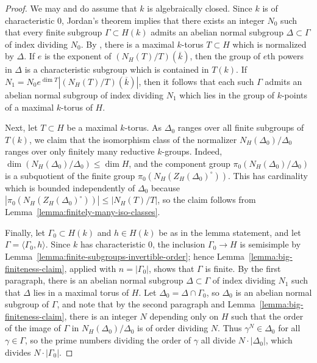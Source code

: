 \documentclass[reqno]{amsart}
\numberwithin{equation}{subsection}
\newcommand{\ol}[1]{\overline{#1}}
\theoremstyle{remark}
\numberwithin{equation}{subsection}
\numberwithin{figure}{subsection}
\begin{document}
\begin{proof}
We may and do assume that $k$ is algebraically closed. Since $k$ is of characteristic $0$, Jordan's theorem implies that there exists an integer $N_0$ such that every finite subgroup $\Gamma \subset H(k)$ admits an abelian normal subgroup $\Delta \subset \Gamma$ of index dividing $N_0$. By \cite[Chapter II, Theorem 5.17]{SS70}, there is a maximal $k$-torus $T \subset H$ which is normalized by $\Delta$. If $e$ is the exponent of $(N_H(T)/T)(\ol k)$, then the group of $e$th powers in $\Delta$ is a characteristic subgroup which is contained in $T(k)$. If $N_1 = N_0 e^{\dim T} |(N_H(T)/T)(\ol k)|$, then it follows that each such $\Gamma$ admits an abelian normal subgroup of index dividing $N_1$ which lies in the group of $k$-points of a maximal $k$-torus of $H$.

Next, let $T \subset H$ be a maximal $k$-torus. As $\Delta_0$ ranges over all finite subgroups of $T(k)$, we claim that the isomorphism class of the normalizer $N_H(\Delta_0)/\Delta_0$ ranges over only finitely many reductive $k$-groups. Indeed, $\dim(N_H(\Delta_0)/\Delta_0) \leq \dim H$, and the component group $\pi_0(N_H(\Delta_0)/\Delta_0)$ is a subquotient of the finite group $\pi_0(N_H(Z_H(\Delta_0)^\circ))$. This has cardinality which is bounded independently of $\Delta_0$ because $|\pi_0(N_H(Z_H(\Delta_0)^\circ))| \leq |N_H(T)/T|$, so the claim follows from Lemma~\ref{lemma:finitely-many-iso-classes}.

Finally, let $\Gamma_0 \subset H(k)$ and $h \in H(k)$ be as in the lemma statement, and let $\Gamma = \langle\Gamma_0, h\rangle$. Since $k$ has characteristic $0$, the inclusion $\Gamma_0 \to H$ is semisimple by Lemma~\ref{lemma:finite-subgroups-invertible-order}; hence Lemma~\ref{lemma:big-finiteness-claim}, applied with $n=|\Gamma_0|$, shows that $\Gamma$ is finite. By the first paragraph, there is an abelian normal subgroup $\Delta \subset \Gamma$ of index dividing $N_1$ such that $\Delta$ lies in a maximal torus of $H$. Let $\Delta_0 = \Delta \cap \Gamma_0$, so $\Delta_0$ is an abelian normal subgroup of $\Gamma$, and note that by the second paragraph and Lemma~\ref{lemma:big-finiteness-claim}, there is an integer $N$ depending only on $H$ such that the order of the image of $\Gamma$ in $N_H(\Delta_0)/\Delta_0$ is of order dividing $N$. Thus $\gamma^N \in \Delta_0$ for all $\gamma \in \Gamma$, so the prime numbers dividing the order of $\gamma$ all divide $N \cdot |\Delta_0|$, which divides $N \cdot |\Gamma_0|$.
\end{proof}
\end{document}
